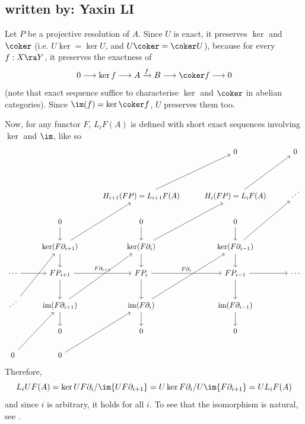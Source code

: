 \subsection{written by: Yaxin LI}
Let $P$ be a projective resolution of $A$. Since $U$ is exact, it preserves $\ker$ and $\coker$ (i.e. $U\ker=\ker U$, and $U\coker=\coker U$), because for every $f:X\ra Y$, it preserves the exactness of
\[0\longrightarrow\ker f\longrightarrow A\xrightarrow{f}B\longrightarrow\coker f\longrightarrow0\]
(note that exact sequence suffice to characterise $\ker$ and $\coker$ in abelian categories). Since $\im(f)=\ker\coker f$, $U$ preserves them too.

Now, for any functor $F$, $L_iF(A)$ is defined with short exact sequences involving $\ker$ and $\im$, like so
\[
    \begin{tikzcd}
        &                                                          &                                                      & 0                                            & 0       \\
        &                                                          &                                                      &                                              &         \\
        &                                                          & H_{i+1}(FP)=L_{i+1}F(A) \arrow[ruu]                  & H_i(FP)=L_iF(A) \arrow[ruu]                  & \iddots \\
        & 0 \arrow[d]                                              & 0 \arrow[d]                                          & 0 \arrow[d]                                  &         \\
        & \ker(F\partial_{i+1}) \arrow[d] \arrow[ruu]              & \ker(F\partial_i) \arrow[d] \arrow[ruu]              & \ker(F\partial_{i-1}) \arrow[d] \arrow[ruu]  &         \\
\cdots \arrow[r]    & FP_{i+1} \arrow[r, "F\partial_{i+1}"] \arrow[d]          & FP_i \arrow[r, "F\partial_i"] \arrow[d]              & FP_{i-1} \arrow[r] \arrow[d]                 & \cdots  \\
\iddots \arrow[ruu] & \operatorname{im}(F\partial_{i+1}) \arrow[d] \arrow[ruu] & \operatorname{im}(F\partial_i) \arrow[d] \arrow[ruu] & \operatorname{im}(F\partial_{i-1}) \arrow[d] &         \\
        & 0                                                        & 0                                                    & 0                                            &         \\
0 \arrow[ruu]       & 0 \arrow[ruu]                                            &                                                      &                                              &        
\end{tikzcd}
\]
Therefore,
\[L_iUF(A)=\ker{UF\partial_i}/\im{UF\partial_{i+1}}=U\ker{F\partial_i}/U\im{F\partial_{i+1}}=UL_iF(A)\]
and since $i$ is arbitrary, it holds for all $i$. To see that the isomorphism is natural, see \cite{Pedro_2018}.